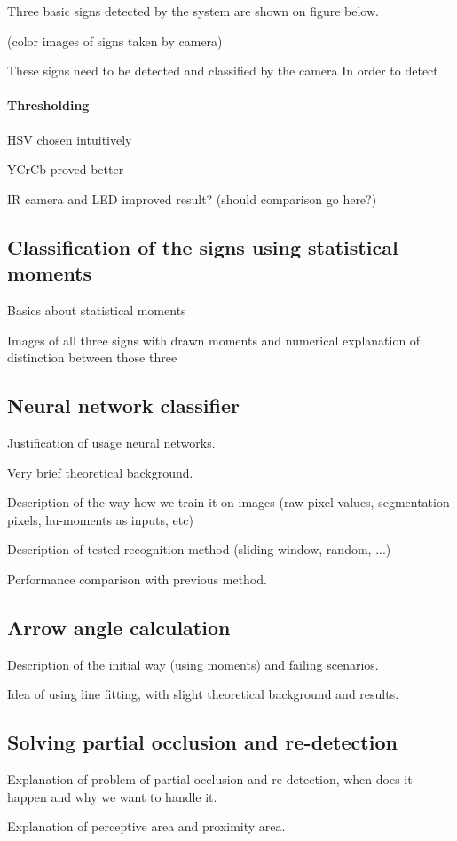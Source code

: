 
Three basic signs detected by the system are shown on figure below.

(color images of signs taken by camera)

These signs need to be detected and classified by the camera In order to detect

\paragraph{Thresholding}

HSV chosen intuitively

YCrCb proved better

IR camera and LED improved result? (should comparison go here?)

\subsection{Classification of the signs using statistical moments}

Basics about statistical moments

Images of all three signs with drawn moments and numerical explanation of distinction between those three

\subsection{Neural network classifier}

Justification of usage neural networks.

Very brief theoretical background.

Description of the way how we train it on images (raw pixel values, segmentation pixels, hu-moments as inputs, etc)

Description of tested recognition method (sliding window, random, ...)

Performance comparison with previous method.

\subsection{Arrow angle calculation}

Description of the initial way (using moments) and failing scenarios. 

Idea of using line fitting, with slight theoretical background and results.

\subsection{Solving partial occlusion and re-detection}

Explanation of problem of partial occlusion and re-detection, when does it happen and why we want to handle it.

Explanation of perceptive area and proximity area.




